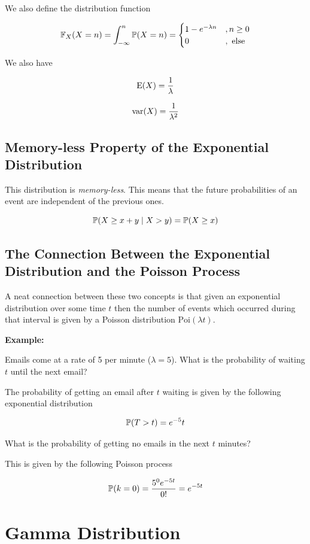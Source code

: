 We also define the distribution function 

\[
    \mathbb{F}_X(X = n) = \int_{- \infty}^{n} \mathbb{P}(X = n) = \begin{cases}
	1 - e^{- \lambda n} &, n \ge 0 \\ 
	0 &, \text{ else }
    \end{cases} 
\]

We also have 
     
\[
    \mathrm{E}(X) = \frac{1}{\lambda}
\]
    
\[
    \mathrm{var}(X) = \frac{1}{\lambda^2}
\]
    
\subsection{Memory-less Property of the Exponential Distribution}

This distribution is \emph{memory-less}. This means that the future probabilities of an event are independent 
of the previous ones. 

\[
    \mathbb{P} (X \ge x + y \mid X > y) = \mathbb{P}(X \ge x)
\]

\subsection{The Connection Between the Exponential Distribution and the Poisson Process}

A neat connection between these two concepts is that given an exponential distribution 
over some time \(t\) then the number of events which occurred during that interval is given by a Poisson distribution \(\mathrm{Poi}(\lambda t)\).

\textbf{Example:}

Emails come at a rate of 5 per minute (\(\lambda = 5\)). What is the probability of waiting \(t\) until the next email?

The probability of getting an email after \(t\) waiting is given by the following exponential distribution

\[
    \mathbb{P}(T > t) = e^{-5}t
\]

What is the probability of getting no emails in the next \(t\) minutes?

This is given by the following Poisson process 

\[
    \mathbb{P}(k = 0) = \frac{5^0 e^{-5t}}{0!} = e^{-5t}
\]

\section{Gamma Distribution}

